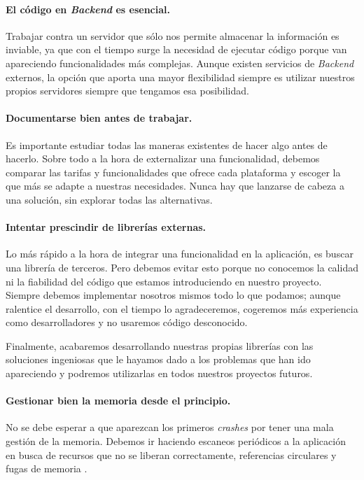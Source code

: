 \paragraph{El código en \textit{Backend} es esencial.}
Trabajar contra un servidor que sólo nos permite almacenar la información es inviable, ya que con el tiempo surge la necesidad de ejecutar código porque van apareciendo  funcionalidades más complejas. Aunque existen servicios de \textit{Backend} externos, la opción que aporta una mayor flexibilidad siempre es utilizar nuestros propios servidores siempre que tengamos esa posibilidad.

\paragraph{Documentarse bien antes de trabajar.}
Es importante estudiar todas las maneras existentes de hacer algo antes de hacerlo. Sobre todo a la hora de externalizar una funcionalidad, debemos comparar las tarifas y funcionalidades que ofrece cada plataforma y escoger la que más se adapte a nuestras necesidades. Nunca hay que lanzarse de cabeza a una solución, sin explorar todas las alternativas.

\paragraph{Intentar prescindir de librerías externas.}
Lo más rápido a la hora de integrar una funcionalidad en la aplicación, es buscar una librería de terceros. Pero debemos evitar esto porque no conocemos la calidad ni la fiabilidad del código que estamos introduciendo en nuestro proyecto. Siempre debemos implementar nosotros mismos todo lo que podamos; aunque ralentice el desarrollo, con el tiempo lo agradeceremos, cogeremos más experiencia como desarrolladores y no usaremos código desconocido.

Finalmente, acabaremos desarrollando nuestras propias librerías con las soluciones ingeniosas que le hayamos dado a los problemas que han ido apareciendo y podremos utilizarlas en todos nuestros proyectos futuros.

\paragraph{Gestionar bien la memoria desde el principio.}
No se debe esperar a que aparezcan los primeros \textit{crashes} por tener una mala gestión de la memoria. Debemos ir haciendo escaneos periódicos a la aplicación en busca de recursos que no se liberan correctamente, referencias circulares y fugas de memoria  \cite{leandro_perez_memory_nodate}.

